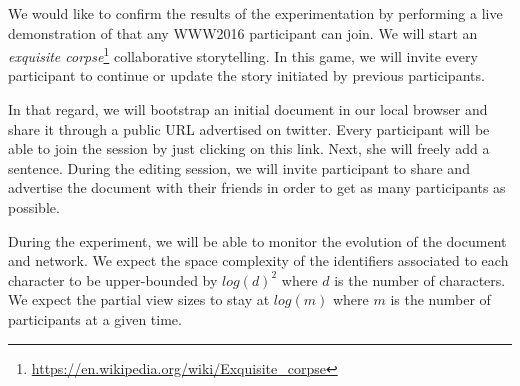 We would like to confirm the results of the experimentation by performing a live
demonstration of \CRATE that any WWW2016 participant can join. We will start an
\emph{exquisite
  corpse}\footnote{\url{https://en.wikipedia.org/wiki/Exquisite_corpse}}
collaborative storytelling. In this game, we will invite every participant to
continue or update the story initiated by previous participants.

In that regard, we will bootstrap an initial document in our local browser and
share it through a public URL advertised on twitter. Every participant will be
able to join the session by just clicking on this link. Next, she will freely
add a sentence. During the editing session, we will invite participant to share
and advertise the document with their friends in order to get as many
participants as possible.

During the experiment, we will be able to monitor the evolution of the document
and network. We expect the space complexity of the identifiers associated to
each character to be upper-bounded by $log(d)^2$ where $d$ is the number of
characters. We expect the partial view sizes to stay at $log(m)$ where $m$ is
the number of participants at a given time.
 

